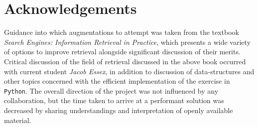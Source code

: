 \documentclass[11pt, a4paper, twocolumn]{article}   	%
\begin{document}
\section{Acknowledgements}
Guidance into which augmentations to attempt was taken from the textbook \emph{Search Engines: Information Retrieval in Practice}, which presents a wide variety of options to improve retrieval alongside significant discussion of their merits. Critical discussion of the field of retrieval discussed in the above book occurred with current student \emph{Jacob Essex}, in addition to discussion of data-structures and other topics concerned with the efficient implementation of the exercise in \verb|Python|. The overall direction of the project was not influenced by any collaboration, but the time taken to arrive at a performant solution was decreased by sharing understandings and interpretation of openly available material.
\end{document}
